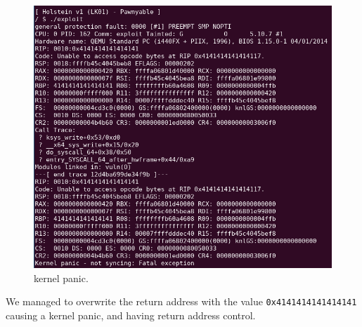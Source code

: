     \begin{figure}[htbp]
        \centering
        \includegraphics[width=1\linewidth]{Images/kernel_panic.png}
        \caption{kernel panic.}
        \label{fig:enter-label}
    \end{figure}

    
    We managed to overwrite the return address with the value \texttt{0x4141414141414141} causing a kernel panic, and having return address control.\newline
